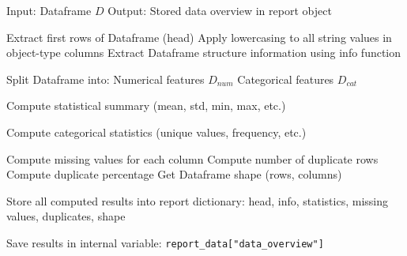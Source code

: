 \begin{algorithm}[H]
\caption{Data Overview Generation}
\label{alg:data_overview}

\begin{algorithmic}[1]

\STATE Input: Dataframe $D$
\STATE Output: Stored data overview in report object

\STATE Extract first rows of Dataframe (head)
\STATE Apply lowercasing to all string values in object-type columns
\STATE Extract Dataframe structure information using info function

\STATE Split Dataframe into:
\STATE \quad Numerical features $D_{num}$
\STATE \quad Categorical features $D_{cat}$

    \STATE Compute statistical summary (mean, std, min, max, etc.)
\ENDIF

    \STATE Compute categorical statistics (unique values, frequency, etc.)
\ENDIF

\STATE Compute missing values for each column
\STATE Compute number of duplicate rows
\STATE Compute duplicate percentage
\STATE Get Dataframe shape (rows, columns)

\STATE Store all computed results into report dictionary:
\STATE \quad head, info, statistics, missing values, duplicates, shape

\STATE Save results in internal variable: \texttt{report\_data["data\_overview"]}

\end{algorithmic}
\end{algorithm}